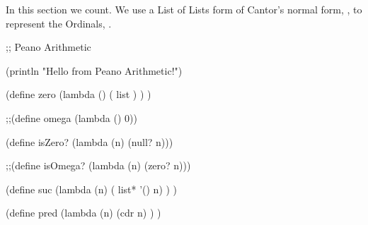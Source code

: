 
In this section we count. We use a List of Lists form of Cantor's normal form,
\cite[Theorem 2.26]{jech2003setTheory}, to represent the Ordinals, \Ordinal{}.

\begin{bnf*}
\end{bnf*}

\begin{racket}
;; Peano Arithmetic

(println "Hello from Peano Arithmetic!")

(define zero (lambda () ( list ) ) )

;;(define omega (lambda () 0))

(define isZero? (lambda (n) (null? n)))

;;(define isOmega? (lambda (n) (zero? n)))

(define suc (lambda (n) ( list* '() n) ) )

(define pred (lambda (n) (cdr n) ) )
\end{racket}
